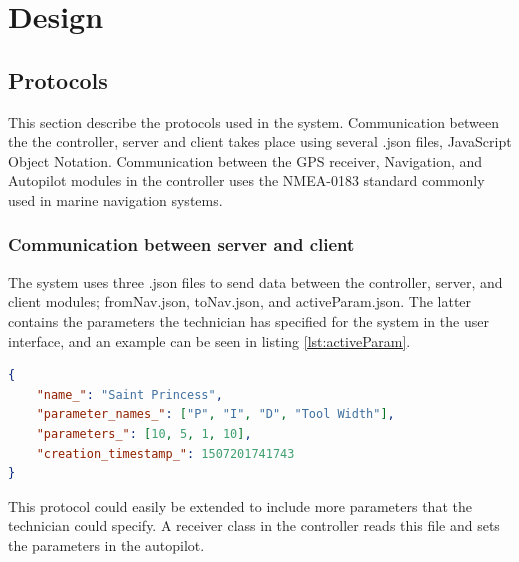 \newpage
\chapter{Design}

\section{Protocols}

This section describe the protocols used in the system. Communication between the the controller, server and client takes place using several .json files, JavaScript Object Notation. Communication between the GPS receiver, Navigation, and Autopilot modules in the controller uses the NMEA-0183 standard commonly used in marine navigation systems\cite{NMEA_wiki}. 

\subsection{Communication between server and client}

The system uses three .json files to send data between the controller, server, and client modules; fromNav.json, toNav.json, and activeParam.json. The latter contains the parameters the technician has specified for the system in the user interface, and an example can be seen in listing \ref{lst:activeParam}.

\begin{lstlisting}[caption = {Example of activeParam.JSON}, captionpos=b, label={lst:activeParam}, language=json,firstnumber=1]
{
	"name_": "Saint Princess",
	"parameter_names_": ["P", "I", "D", "Tool Width"],
	"parameters_": [10, 5, 1, 10],
	"creation_timestamp_": 1507201741743
}
\end{lstlisting}

This protocol could easily be extended to include more parameters that the technician could specify. A receiver class in the controller reads this file and sets the parameters in the autopilot.

